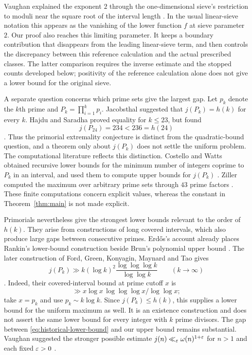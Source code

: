 Vaughan explained the exponent $2$ through the one-dimensional sieve's
restriction to moduli near the square root of the interval length
\cite[p.~329]{Vaughan1977}. In the usual linear-sieve notation this
appears as the vanishing of the lower function $f$ at sieve parameter
$2$. Our proof also reaches this limiting parameter. It keeps a
boundary contribution that disappears from the leading linear-sieve
term, and then controls the discrepancy between this reference
calculation and the actual prescribed classes. The latter comparison
requires the inverse estimate and the stopped counts developed below;
positivity of the reference calculation alone does not give a lower
bound for the original sieve.

A separate question concerns which prime sets give the largest gap.
Let $p_k$ denote the $k$th prime and $P_k=\prod_{i=1}^k p_i$.
Jacobsthal suggested that $j(P_k)=h(k)$ for every $k$.
Hajdu and Saradha proved equality for $k\le23$, but found
\[
 j(P_{24})=234<236=h(24)
\]
\cite[Theorem~1.2]{HajduSaradha2012}.
Thus the primorial extremality conjecture is distinct from the
quadratic-bound question, and a theorem only about $j(P_k)$ does not
settle the uniform problem. The computational literature reflects
this distinction. Costello and Watts obtained recursive lower bounds
for the minimum number of integers coprime to $P_k$ in an interval,
and used them to compute upper bounds for $j(P_k)$
\cite[Theorem~4.4 and Section~5]{CostelloWatts2015}.
Ziller computed the maximum over arbitrary prime sets through
$43$ prime factors \cite[Section~3]{Ziller2019}.
These finite computations concern explicit values, whereas the
constant in Theorem~\ref{thm:main} is not made explicit.

Primorials nevertheless give the strongest lower bounds relevant to
the order of $h(k)$. They arise from constructions of long covered
intervals, which also produce large gaps between consecutive primes.
Erd\H{o}s's account already places Rankin's lower-bound construction
beside Brun's polynomial upper bound \cite[p.~163, equation (2)]{Erdos1962}.
The later construction of Ford, Green, Konyagin, Maynard and Tao gives
\begin{equation}\label{eq:historical-lower-bound}
 j(P_k)\gg
 k(\log k)^2\frac{\log\log\log k}{\log\log k}
 \qquad(k\longrightarrow\infty)
\end{equation}
\cite[Section~1.1]{FGKMT2018}.
Indeed, their covered-interval bound at prime cutoff $x$ is
\[
 \gg x\log x\,\log\log\log x/\log\log x;
\]
take $x=p_k$ and use
$p_k\sim k\log k$.
Since $j(P_k)\le h(k)$, this supplies a lower bound for the uniform
maximum as well. It is an existence construction and does not assert
the same lower bound for every integer with $k$ prime divisors.
The gap between \eqref{eq:historical-lower-bound} and our upper bound
remains substantial. Vaughan suggested the stronger possible estimate
$j(n)\ll_\varepsilon\omega(n)^{1+\varepsilon}$ for $n>1$ and each fixed $\varepsilon>0$
\cite[p.~329]{Vaughan1977}.


